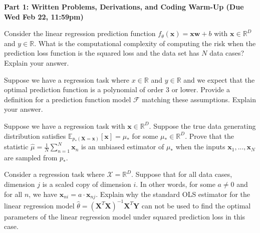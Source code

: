 \documentclass[11pt]{article}
\newcommand{\mbf}[1]{{\mathbf{#1}}}
\begin{document}
\textbf{Part 1: Written Problems, Derivations, and Coding Warm-Up (Due Wed Feb 22, 11:59pm)}

\begin{problem}{5} Consider the linear regression prediction function $f_{\theta}(\mbf{x}) = \mbf{x}\mbf{w}+b$ with $\mbf{x}\in\mathbb{R}^D$ and $y\in\mathbb{R}$. What is the computational complexity of computing the risk when the prediction loss function is the squared loss and the data set has $N$ data cases? Explain your answer. 
\end{problem}

\begin{problem}{5} Suppose we have a regression task where $x\in\mathbb{R}$ and $y\in\mathbb{R}$ and we expect that the optimal prediction function is a polynomial of order 3 or lower. Provide a definition for a prediction function model $\mathcal{F}$ matching these assumptions. Explain your answer.
\end{problem}

\begin{problem}{10} Suppose we have a regression task with $\mbf{x}\in\mathbb{R}^D$. Suppose the true data generating distribution satisfies $\mathbb{E}_{p_*(\mbf{X}=\mbf{x})}[\mbf{x}]=\mu_*$ for some $\mu_*\in\mathbb{R}^D$. Prove that the statistic $\hat{\mu} = \frac{1}{N}\sum_{n=1}^N\mbf{x}_n$ is an unbiased estimator of $\mu_*$ when the inputs $\mbf{x}_1,...,\mbf{x}_N$ are sampled from $p_*$.
\end{problem}

\begin{problem}{10} Consider a regression task where $\mathcal{X}=\mathbb{R}^D$. Suppose that for all data cases, dimension $j$ is a scaled copy of dimension $i$. In other words, for some $a\neq 0$ and for all $n$, we have $\mbf{x}_{ni} = a\cdot\mbf{x}_{nj}$. Explain why the standard OLS estimator for the linear regression model $\hat{\theta}=(\mbf{X}^T\mbf{X})^{-1}\mbf{X}^T\mbf{Y}$ can not be used to find the optimal parameters of the linear regression model under squared prediction loss in this case.
\end{problem}
\end{document}
